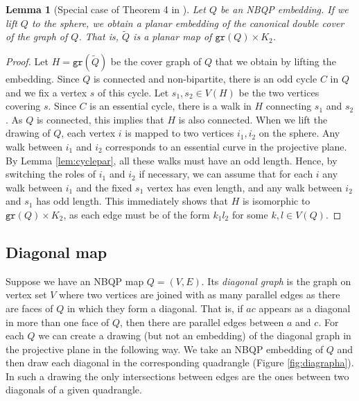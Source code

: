 \documentclass[10pt,a4paper]{article}
\newtheorem{lemma}[theorem]{Lemma}
\newcommand{\gr}{\mathtt{gr}}
\begin{document}
\begin{lemma}[Special case of Theorem 4 in \cite{NE92}]\label{lem:bqlift}
Let $Q$ be an NBQP embedding. If we lift $Q$ to the sphere, we obtain a planar embedding of the canonical double cover of the graph of $Q$. That is, $\widetilde Q$ is a planar map of $\gr (Q)\times K_2$. 
\end{lemma}
\begin{proof}

    Let $H=\gr(\widetilde Q)$ be the cover graph of $Q$ that we obtain by lifting the embedding. Since $Q$ is connected and non-bipartite, there is an odd cycle $C$ in $Q$ and we fix a vertex $s$ of this cycle. Let $s_1,s_2\in V(H)$ be the two vertices covering $s$.  Since $C$ is an essential cycle, there is a walk in $H$ connecting $s_1$ and $s_2$. As $Q$ is connected, this implies that $H$ is also connected. When we lift the drawing of $Q$, each vertex $i$ is mapped to two vertices $i_1,i_2$ on the sphere. Any walk between $i_1$ and $i_2$ corresponds to an essential curve in the projective plane. By Lemma \ref{lem:cyclepar}, all these walks must have an odd length. Hence, by switching the roles of $i_1$ and $i_2$ if necessary, we can assume that for each $i$ any walk between $i_1$ and the fixed $s_1$ vertex has even length, and any walk between $i_2$ and $s_1$ has odd length. This immediately shows that $H$ is isomorphic to $ {\gr(Q)}\times K_2$, as each edge must be of the form $k_1l_2$ for some $k,l\in V(Q)$. 

    
\end{proof}




\subsection{Diagonal map}
Suppose we have an NBQP map $Q=(V,E)$. Its \emph{diagonal graph} is the graph on vertex set $V$ where two vertices are joined with as many parallel edges as there are faces of $Q$ in which they form a diagonal. That is, if $ac$ appears as a diagonal in more than one face of $Q$, then there are parallel edges between $a$ and $c$. For each $Q$ we can create a drawing (but not an embedding) of the diagonal graph in the projective plane in the following way. We take an NBQP embedding of $Q$ and then draw each diagonal in the corresponding quadrangle (Figure \ref{fig:diagrapha}). In such a drawing the only intersections between edges are the ones between two diagonals of a given quadrangle.   
\end{document}
